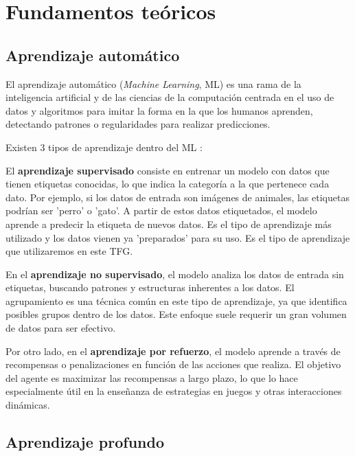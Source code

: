 \chapter{Fundamentos teóricos}
\thispagestyle{empty}

\section{Aprendizaje automático}
El aprendizaje automático (\textit{Machine Learning}, ML) \cite{20,21} es una rama de la inteligencia artificial y de las ciencias de la computación centrada en el uso de datos y algoritmos para imitar la forma en la que los humanos aprenden, detectando patrones o regularidades para realizar predicciones.

Existen 3 tipos de aprendizaje dentro del ML \cite{22,23}:

El \textbf{aprendizaje supervisado} consiste en entrenar un modelo con datos que tienen etiquetas conocidas, lo que indica la categoría a la que pertenece cada dato. Por ejemplo, si los datos de entrada son imágenes de animales, las etiquetas podrían ser 'perro' o 'gato'. A partir de estos datos etiquetados, el modelo aprende a predecir la etiqueta de nuevos datos. Es el tipo de aprendizaje más utilizado y los datos vienen ya 'preparados' para su uso. Es el tipo de aprendizaje que utilizaremos en este TFG.

En el \textbf{aprendizaje no supervisado}, el modelo analiza los datos de entrada sin etiquetas, buscando patrones y estructuras inherentes a los datos. El agrupamiento es una técnica común en este tipo de aprendizaje, ya que identifica posibles grupos dentro de los datos. Este enfoque suele requerir un gran volumen de datos para ser efectivo.

Por otro lado, en el \textbf{aprendizaje por refuerzo}, el modelo aprende a través de recompensas o penalizaciones en función de las acciones que realiza. El objetivo del agente es maximizar las recompensas a largo plazo, lo que lo hace especialmente útil en la enseñanza de estrategias en juegos y otras interacciones dinámicas.

\section{Aprendizaje profundo}

